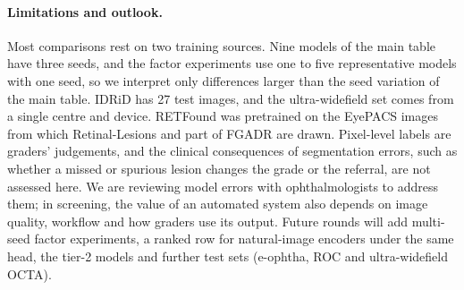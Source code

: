 \paragraph{Limitations and outlook.} Most comparisons rest on two training sources. Nine models of the main table have three seeds, and the factor experiments use one to five representative models with one seed, so we interpret only differences larger than the seed variation of the main table. IDRiD has 27 test images, and the ultra-widefield set comes from a single centre and device. RETFound was pretrained on the EyePACS images from which Retinal-Lesions and part of FGADR are drawn. Pixel-level labels are graders' judgements, and the clinical consequences of segmentation errors, such as whether a missed or spurious lesion changes the grade or the referral, are not assessed here. We are reviewing model errors with ophthalmologists to address them; in screening, the value of an automated system also depends on image quality, workflow and how graders use its output\cite{beede2020chi,ruamviboonsuk2022thailand,sayres2019integratedgradients}. Future rounds will add multi-seed factor experiments, a ranked row for natural-image encoders under the same head, the tier-2 models and further test sets (e-ophtha\cite{decenciere2013eophthateleophta}, ROC\cite{niemeijer2010roc} and ultra-widefield OCTA).
